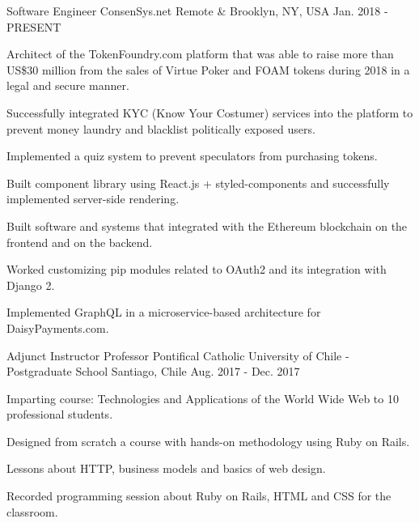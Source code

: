 

\begin{cventries}

  \cventry
    {Software Engineer}
    {ConsenSys.net}
    {Remote \& Brooklyn, NY, USA}
    {Jan. 2018 - PRESENT}
    {
      \begin{cvitems}
        \item {Architect of the TokenFoundry.com platform that was able to raise more than US\$30 million from the sales of Virtue Poker and FOAM tokens during 2018 in a legal and secure manner.}
        \item Successfully integrated KYC (Know Your Costumer) services into the platform to prevent money laundry and blacklist politically exposed users.
        \item Implemented a quiz system to prevent speculators from purchasing tokens.
        \item {Built component library using React.js + styled-components and successfully implemented server-side rendering.}
        \item {Built software and systems that integrated with the Ethereum blockchain on the frontend and on the  backend.}
        \item {Worked customizing pip modules related to OAuth2 and its integration with Django 2.}
        \item Implemented GraphQL in a microservice-based architecture for DaisyPayments.com.
      \end{cvitems}
    }
  
  \cventry
    {Adjunct Instructor Professor}
    {Pontifical Catholic University of Chile - Postgraduate School}
    {Santiago, Chile}
    {Aug. 2017 - Dec. 2017}
    {
      \begin{cvitems}
        \item {Imparting course: Technologies and Applications of the World Wide Web to 10 professional students.}
        \item {Designed from scratch a course with hands-on methodology using Ruby on Rails.}
        \item {Lessons about HTTP, business models and basics of web design.}
        \item {Recorded programming session about Ruby on Rails, HTML and CSS for the classroom.}
      \end{cvitems}
    }


\end{cventries}

